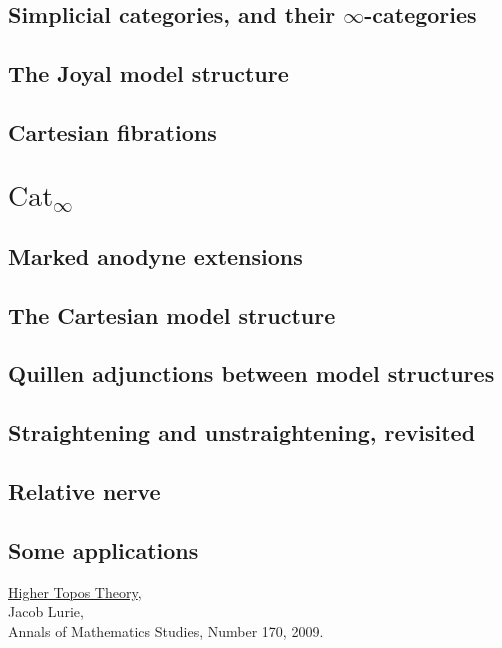 \documentclass[a4paper, 12pt]{amsart}
\newcommand{\8}{\infty}
\begin{document}
\subsection{Simplicial categories, and their \texorpdfstring{$\8$-categories}{∞-categories}}
\subsection{The Joyal model structure}
\subsection{Cartesian fibrations}

\section{\texorpdfstring{$\text{Cat}_\8$}{Cat∞}}
\subsection{Marked anodyne extensions}
\subsection{The Cartesian model structure}
\subsection{Quillen adjunctions between model structures}
\subsection{Straightening and unstraightening, revisited}
\subsection{Relative nerve}
\subsection{Some applications}


\begin{thebibliography}{99}
  \href{https://arxiv.org/abs/math/0608040}{Higher Topos Theory}, \\
  Jacob Lurie, \\
  Annals of Mathematics Studies, Number 170, 2009.
\end{thebibliography}
\end{document}
